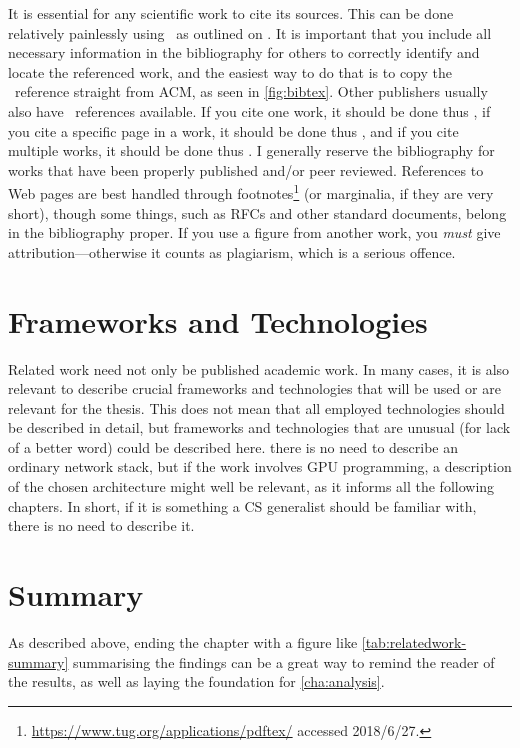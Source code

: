 It is essential for any scientific work to cite its sources. This can be
done relatively painlessly using \mBibTeX\ as outlined on
. It is important that you include all necessary
information in the bibliography for others to correctly identify and locate
the referenced work, and the easiest way to do that is to copy the \mBibTeX\
reference straight from ACM, as seen in \autoref{fig:bibtex}.  Other
publishers usually also have \mBibTeX\ references available. If you cite one
work, it should be done thus \cite{Kristensen2010:MP2P2010}, if you cite a
specific page in a work, it should be done thus
\cite[p. 410]{Chawathe2003:2003}, and if you cite multiple works, it should
be done thus
\cite{knuth:1976,knuth:1974,Kristensen2010:MP2P2010,Mittelbach2004:TLC2004}.
I generally reserve the bibliography for works that have been properly
published and/or peer reviewed. References to Web pages are best handled
through footnotes\footnote{\url{https://www.tug.org/applications/pdftex/}
  accessed 2018/6/27.} (or
marginalia, if they are very
short), though some things, such as RFCs and other standard documents,
belong in the bibliography proper. If you use a figure from another work,
you \emph{must} give attribution---otherwise it counts as plagiarism, which is
a serious offence.


\section{Frameworks and Technologies}
\label{sec:fram-techn}

Related work need not only be published academic work. In many cases, it is
also relevant to describe crucial frameworks and technologies that will be
used or are relevant for the thesis.  This does not mean that all employed
technologies should be described in detail, but frameworks and technologies
that are unusual (for lack of a better word) could be described here. \Eg
there is no need to describe an ordinary network stack, but if the work
involves GPU programming, a description of the chosen architecture might
well be relevant, as it informs all the following chapters.  In short, if it
is something a CS generalist should be familiar with, there is no need to
describe it.

\section{Summary}
\label{sec:summary}
As described above, ending the chapter with a figure like
\autoref{tab:relatedwork-summary} summarising the findings can be a great way
to remind the reader of the results, as well as laying the foundation for
\autoref{cha:analysis}.


